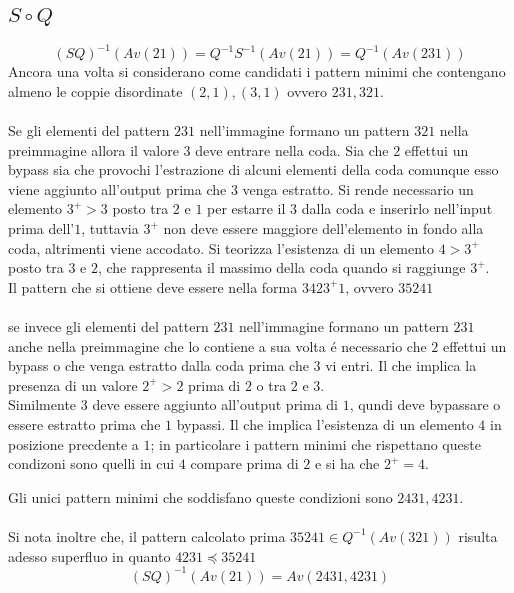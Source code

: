 \subsection*{$S\circ{Q}$}$$(SQ)^{-1}(Av(21))=Q^{-1}S^{-1}(Av(21))=Q^{-1}(Av(231))$$Ancora una volta si considerano come candidati i pattern minimi che contengano almeno le coppie disordinate $(2,1),(3,1)$ ovvero $231,321$.\\\\
Se gli elementi del pattern $231$ nell'immagine formano un pattern $321$ nella preimmagine allora il valore $3$ deve entrare nella coda. Sia che $2$ effettui un bypass sia che provochi l'estrazione di alcuni elementi della coda comunque esso viene aggiunto all'output prima che $3$ venga estratto. Si rende necessario un elemento $3^+>3$ posto tra $2$ e $1$ per estarre il $3$ dalla coda e inserirlo nell'input prima dell'$1$, tuttavia $3^+$ non deve essere maggiore dell'elemento in fondo alla coda, altrimenti viene accodato. Si teorizza l'esistenza di un elemento $4>3^+$ posto tra $3$ e $2$, che rappresenta il massimo della coda quando si raggiunge $3^+$.\\
Il pattern che si ottiene deve essere nella forma $3423^+1$, ovvero $35241$\\\\
se invece gli elementi del pattern $231$ nell'immagine formano un pattern $231$ anche nella preimmagine che lo contiene a sua volta \'e necessario che $2$ effettui un bypass o che venga estratto dalla coda prima che $3$ vi entri. Il che implica la presenza di un valore $2^+>2$ prima di $2$ o tra $2$ e $3$.\\Similmente $3$ deve essere aggiunto all'output prima di $1$, qundi deve bypassare o essere estratto prima che $1$ bypassi. Il che implica l'esistenza di un elemento $4$ in posizione precdente a $1$; in particolare i pattern minimi che rispettano queste condizoni sono quelli in cui $4$ compare prima di $2$ e si ha che $2^+=4$.\\
\begin{center}
\end{center}
Gli unici pattern minimi che soddisfano queste condizioni sono $2431,4231$.
\\\\Si nota inoltre che, il pattern calcolato prima $35241\in Q^{-1}(Av(321))$ risulta adesso superfluo in quanto $4231\preceq35241$
$$(SQ)^{-1}(Av(21))=Av(2431,4231)$$
